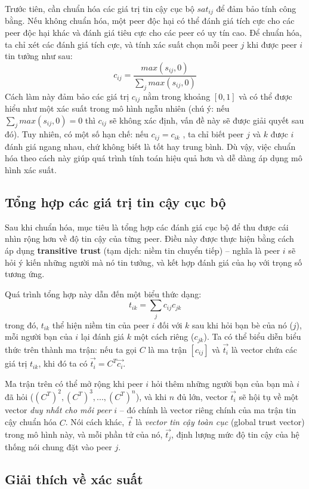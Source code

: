 Trước tiên, cần chuẩn hóa các giá trị tin cậy cục bộ $sat_{ij}$ để đảm bảo tính công bằng. Nếu không chuẩn hóa, một peer độc hại có thể đánh giá tích cực cho các peer độc hại khác và
đánh giá tiêu cực cho các peer có uy tín cao. Để chuẩn hóa, ta chỉ xét các đánh giá tích cực, và tính xác suất chọn mỗi peer $j$ khi được peer $i$ tin tưởng như sau:
\[c_{ij} = \frac{max(s_{ij}, 0)}{\sum_{j} max(s_{ij}, 0)}\]
Cách làm này đảm bảo các giá trị $c_{ij}$ nằm trong khoảng $[0, 1]$ và có thể được hiểu như một xác suất trong mô hình ngẫu nhiên
(chú ý: nếu $\sum_{j} max(s_{ij}, 0) = 0$ thì $c_{ij}$ sẽ không xác định, vấn đề này sẽ được giải quyết sau đó).
Tuy nhiên, có một số hạn chế: nếu $c_{ij} = c_{ik}$ , ta chỉ biết peer $j$ và $k$ được $i$ đánh giá ngang nhau, chứ không biết là tốt hay trung bình.
Dù vậy, việc chuẩn hóa theo cách này giúp quá trình tính toán hiệu quả hơn và dễ dàng áp dụng mô hình xác suất.

\subsection{Tổng hợp các giá trị tin cậy cục bộ}

Sau khi chuẩn hóa, mục tiêu là tổng hợp các đánh giá cục bộ để thu được cái nhìn rộng hơn về độ tin cậy của từng peer.
Điều này được thực hiện bằng cách áp dụng \textbf{transitive trust} (tạm dịch: niềm tin chuyển tiếp)
-- nghĩa là peer $i$ sẽ hỏi ý kiến những người mà nó tin tưởng, và kết hợp đánh giá của họ với trọng số tương ứng.

Quá trình tổng hợp này dẫn đến một biểu thức dạng:
\[t_{ik} = \sum_{j} c_{ij}c_{jk}\]
trong đó, $t_{ik}$ thể hiện niềm tin của peer $i$ đối với $k$ sau khi hỏi bạn bè của nó ($j$), mỗi người bạn của $i$ lại đánh giá $k$ một cách riêng ($c_{jk}$).
Ta có thể biểu diễn biểu thức trên thành ma trận: nếu ta gọi $C$ là ma trận $[c_{ij}]$ và $\vec{t_i}$ là vector chứa các giá trị $t_{ik}$, khi đó ta có
$\vec{t_i} = C^{T}\vec{c_i}$.

Ma trận trên có thể mở rộng khi peer $i$ hỏi thêm những người bạn của bạn mà $i$ đã hỏi ($(C^T)^2, (C^T)^3, ..., (C^T)^n$), và khi $n$ đủ lớn, vector $\vec{t_i}$ sẽ hội tụ về một vector
\textit{duy nhất cho mỗi peer} $i$ -- đó chính là vector riêng chính của ma trận tin cậy chuẩn hóa $C$. Nói cách khác, $\vec{t}$ là \textit{vector tin cậy toàn cục} (global trust vector) trong mô hình này,
và mỗi phần tử của nó, $\vec{t_j}$, định lượng mức độ tin cậy của hệ thống nói chung đặt vào peer $j$.

\subsection{Giải thích về xác suất}

